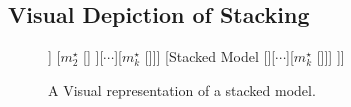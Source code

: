 \documentclass[10pt,a4paper, hidelinks]{article} %
\begin{document}

\subsection{Visual Depiction of Stacking}
\begin{figure}[H]
	\centering
	\begin{forest}
		[Final Predictions [\dattestpreds [\dattest] [$m^\star_1$ [\dattrain]] [$m^\star_2$ [\dattrain] ][$\cdots$][$m^\star_k$ [\dattrain]]] [Stacked Model [\datvaltest [\datval] [$m^\star_1$ [\dattrain]][$\cdots$][$m^\star_k$ [\dattrain]]] ]]
	\end{forest}
\caption{A Visual representation of a stacked model.}
\end{figure}
\end{document}
